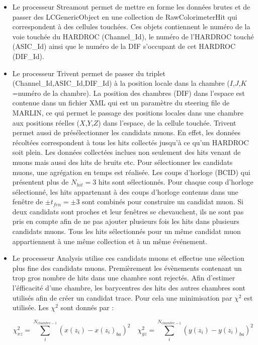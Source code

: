 \begin{itemize}[label=$\bullet$]
	\item Le processeur Streamout permet de mettre en forme les données brutes et de passer des LCGenericObject en une collection de RawColorimeterHit qui correspondent à des cellules touchées. Ces objets contiennent le numéro de la voie touchée du HARDROC (Channel\_Id), le numéro de l'HARDROC touché (ASIC\_Id) ainsi que le numéro de la DIF s'occupant de cet HARDROC (DIF\_Id).
	\item Le processeur Trivent permet de passer du triplet (Channel\_Id,ASIC\_Id,DIF\_Id) à la position locale dans la chambre ($I$,$J$,$K$=numéro de la chambre). La position des chambres (DIF) dans l'espace est contenue dans un fichier XML qui est un paramètre du steering file de MARLIN, ce qui permet le passage des positions locales dans une chambre aux positions réelles ($X$,$Y$,$Z$) dans l'espace, de la cellule touchée. Trivent permet aussi de présélectionner les candidats muons. En effet, les données récoltées correspondent à tous les hits collectés jusqu'à ce qu'un HARDROC soit plein. Les données collectées inclues non seulement des hits venant de muons mais aussi des hits de bruits etc. Pour sélectionner les candidats muons, une agrégation en temps est réalisée. Les coups d'horloge (BCID) qui présentent plus de $N_{hit}=3$ hits sont sélectionnés. Pour chaque coup d'horloge sélectionné, les hits appartenant à des coups d'horloge contenus dans une fenêtre de $\pm t_{fen}=\pm3$ sont combinés pour construire un candidat muon. Si deux candidats sont proches et leur fenêtres se chevauchent, ils ne sont pas pris en compte afin de ne pas ajouter plusieurs fois les hits dans plusieurs candidats muons. Tous les hits sélectionnés pour un même candidat muon appartiennent à une même collection et à un même événement.
	\item Le processeur Analysis utilise ces candidats muons et effectue une sélection plus fine des candidats muons. Premièrement les évènements contenant un trop gros nombre de hits dans une chambre sont rejectés. Afin d'estimer l'éfficacité d'une chambre, les barycentres des hits des autres chambres sont utilisés afin de créer un candidat trace. Pour cela une minimisation par $\chi^2$ est utilisée. Les $\chi^2$ sont donnés par :
	
	\begin{equation}
	\chi_{xz}^2=\sum_i^{N_{chambre-1}}\left(x(z_{i})-x(z_{i})_{ba}\right)^2 \quad \chi_{yz}^2=\sum_i^{N_{chambre-1}}\left(y(z_{i})-y(z_{i})_{ba}\right)^2
	\end{equation}
	

\end{itemize}
